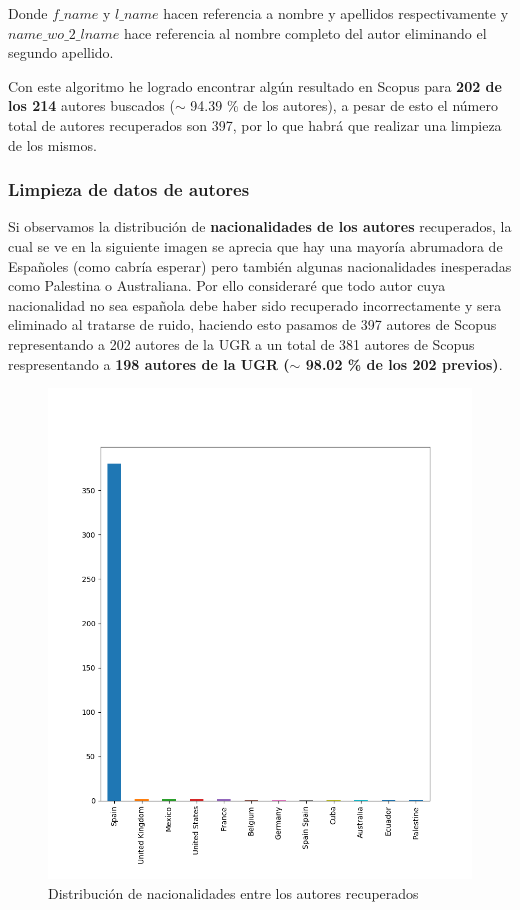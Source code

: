 Donde $f\_name$ y $l\_name$ hacen referencia a nombre y apellidos respectivamente y $name\_wo\_2\_lname$ hace referencia al nombre completo del autor eliminando el segundo apellido.

Con este algoritmo he logrado encontrar algún resultado en Scopus para \textbf{202 de los 214} autores buscados ($\sim$ 94.39 \% de los autores), a pesar de esto el número total de autores recuperados son 397, por lo que habrá que realizar una limpieza de los mismos.

\subsubsection{Limpieza de datos de autores}
Si observamos la distribución de \textbf{nacionalidades de los autores} recuperados, la cual se ve en la siguiente imagen se aprecia que hay una mayoría abrumadora de Españoles (como cabría esperar) pero también algunas nacionalidades inesperadas como Palestina o Australiana. Por ello consideraré que todo autor cuya nacionalidad no sea española debe haber sido recuperado incorrectamente y sera eliminado al tratarse de ruido, haciendo esto pasamos de 397 autores de Scopus representando a 202 autores de la \acrshort{UGR} a un total de 381 autores de Scopus respresentando a \textbf{198 autores de la \acrshort{UGR} ($\sim$ 98.02 \% de los 202 previos)}.

\begin{figure}[h!]
	
	\centering
	\includegraphics[width=0.9\linewidth]{imagenes/country_hist}
	\caption{Distribución de nacionalidades entre los autores recuperados}
\end{figure}

